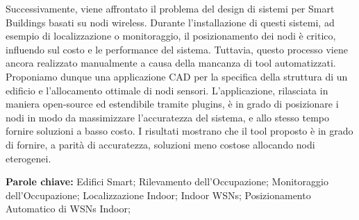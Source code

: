 Successivamente, viene affrontato il problema del design di sistemi per Smart Buildings basati su nodi wireless. Durante l'installazione di questi sistemi, ad esempio di localizzazione o monitoraggio, il posizionamento dei nodi è critico, influendo sul costo e le performance del sistema. Tuttavia, questo processo viene ancora realizzato manualmente a causa della mancanza di tool automatizzati.\\
Proponiamo dunque una applicazione CAD per la specifica della struttura di un edificio e l'allocamento ottimale di nodi sensori. L'applicazione, rilasciata in maniera open-source ed estendibile tramite plugins, è in grado di posizionare i nodi in modo da massimizzare l'accuratezza del sistema, e allo stesso tempo fornire soluzioni a basso costo.
I risultati mostrano che il tool proposto è in grado di fornire, a parità di accuratezza, soluzioni meno costose allocando nodi eterogenei.

\medskip
%
\noindent \textbf{Parole chiave:} 
Edifici Smart; Rilevamento dell'Occupazione; Monitoraggio dell'Occupazione; Localizzazione Indoor; Indoor WSNs; Posizionamento Automatico di WSNs Indoor;
%
%
%
\endgroup			
%
%
